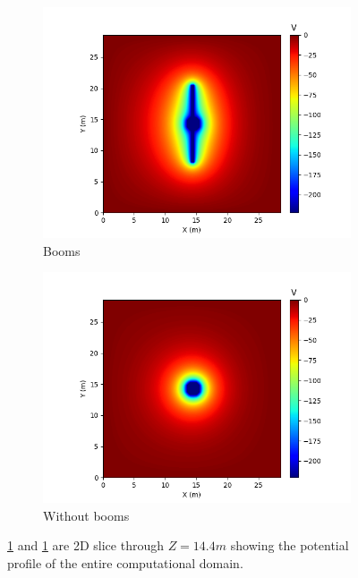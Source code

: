 \begin{center}
\begin{figure}[H]
  \begin{subfigure}[b]{0.61\textwidth}
    \includegraphics[width=\textwidth]{figures/MMO/noPH/WB/P_noPH_WB.png}
    \caption{Booms}
    \label{fig:P_noPH_WB}
  \end{subfigure}
  \hfill
  \begin{subfigure}[b]{0.61\textwidth}
    \includegraphics[width=\textwidth]{figures/MMO/noPH/NB/P_noPH_NB.png}
    \caption{Without booms}
    \label{fig:P_noPH_NB}
  \end{subfigure}
  \label{fig:Pot_noPH}
  \caption{\ref{fig:P_noPH_WB} and \ref{fig:P_noPH_WB} are 2D slice through $Z = 14.4 m$ showing the potential profile of the entire computational domain.}
\end{figure}
\end{center}

